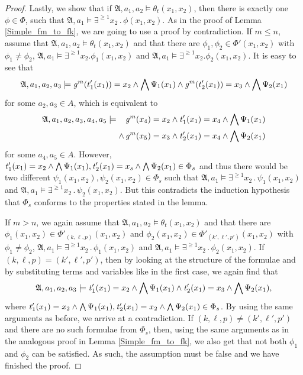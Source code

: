 \begin{proof}
	Lastly, we show that if $\mathfrak A,a_1,a_2\models \theta_t(x_1,x_2)$, then there is exactly one $\phi\in\Phi$, such that $\mathfrak A,a_1\models \exists^{\geq 1} x_2\operatorname{.}\phi(x_1,x_2)$.
	As in the proof of Lemma \ref{Simple_fm_to_fk}, we are going to use a proof by contradiction.
	If $m\leq n$, assume that $\mathfrak A,a_1,a_2\models \theta_t(x_1,x_2)$ and that there are $\phi_1,\phi_2\in \Phi'(x_1,x_2)$ with $\phi_1\neq \phi_2$, $\mathfrak A,a_1\models \exists^{\geq 1}x_2.\phi_1(x_1,x_2)$ and $\mathfrak A,a_1\models \exists^{\geq 1}x_2.\phi_2(x_1,x_2)$.
	It is easy to see that 
	$$\mathfrak A,a_1,a_2,a_3\models \operatorname{\mathit{g}}^m(t'_1(x_1))=x_2 \land \bigwedge \Psi_1(x_1) \land \operatorname{\mathit{g}}^m(t'_2(x_1))=x_3 \land \bigwedge\Psi_2(x_1)$$
	for some $a_2,a_3 \in A$, which is equivalent to
	\begin{align*}
		\mathfrak A,a_1,a_2,a_3,a_4,a_5\models
		\phantom{\land} &\operatorname{\mathit{g}}^m(x_4)=x_2 \land \operatorname{\mathit{t}}'_1(x_1)=x_4\land \bigwedge\Psi_1(x_1) \\ 
		\land &\operatorname{\mathit{g}}^m(x_5)=x_3 \land \operatorname{\mathit{t}}'_2(x_1)=x_4 \land \bigwedge\Psi_2(x_1)
	\end{align*}
	for some $a_4,a_5\in A$.
	However, $\operatorname{\mathit{t}}'_1(x_1)=x_2\land \bigwedge\Psi_1(x_1), \operatorname{\mathit{t}}'_2(x_1)=x_s \land \bigwedge\Psi_2(x_1) \in \Phi_s$ and thus there would be two different $\psi_1(x_1,x_2),\psi_2(x_1,x_2)\in \Phi_s$ such that $\mathfrak A,a_1\models \exists^{\geq 1} x_2\operatorname{.}\psi_1(x_1,x_2)$ and $\mathfrak A,a_1\models \exists^{\geq 1} x_2\operatorname{.}\psi_2(x_1,x_2)$.
	But this contradicts the induction hypothesis that $\Phi_s$ conforms to the properties stated in the lemma.
	
	If $m>n$, we again assume that $\mathfrak A,a_1,a_2\models \theta_t(x_1,x_2)$ and that there are $\phi_1(x_1,x_2)\in\Phi'_{(k,\ell,p)}(x_1,x_2)$ and $\phi_2(x_1,x_2)\in\Phi'_{(k',\ell',p')}(x_1,x_2)$ with $\phi_1\neq \phi_2$, $\mathfrak A,a_1\models \exists^{\geq 1}x_2\operatorname{.}\phi_1(x_1,x_2)$ and $\mathfrak A,a_1\models \exists^{\geq 1}x_2\operatorname{.}\phi_2(x_1,x_2)$.
	If $(k,\ell,p)=(k',\ell',p')$, then by looking at the structure of the formulae and by substituting terms and variables like in the first case, we again find that 
	$$\mathfrak A,a_1,a_2,a_3\models \operatorname{\mathit{t}}'_1(x_1)=x_2\land \bigwedge\Psi_1(x_1) \land \operatorname{\mathit{t}}'_2(x_1)=x_3 \land \bigwedge\Psi_2(x_1),$$
	where $\operatorname{\mathit{t}}'_1(x_1)=x_2\land\bigwedge \Psi_1(x_1), \operatorname{\mathit{t}}'_2(x_1)=x_2\land\bigwedge \Psi_2(x_1)\in \Phi_s$.
	By using the same arguments as before, we arrive at a contradiction.
	If $(k,\ell,p)\neq(k',\ell',p')$ and there are no such formulae from $\Phi_s$, then, using the same arguments as in the analogous proof in Lemma \ref{Simple_fm_to_fk}, we also get that not both $\phi_1$ and $\phi_2$ can be satisfied.
	As such, the assumption must be false and we have finished the proof.
\end{proof}

